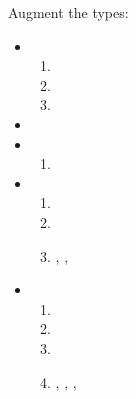 Augment the types:
\begin{itemize}
\item {} 
  \begin{enumerate}
  \item {}
  \item {}
  \item {}
  \end{enumerate}

\item {}
\item {}
  \begin{enumerate}
  \item {}
  \end{enumerate}
\item {}
  \begin{enumerate}
  \item {}
  \item {}
  \item {}, , 
  \end{enumerate}

\item {}
  \begin{enumerate}
  \item {}
  \item {}
  \item {}
  \item {}, , , 
  \end{enumerate} 
\end{itemize}

\iffalse
\begin{lemma}(Balance)\label{lemma:depth}
  \isVal{\texttt{depth}}{\arr{\isOf{s}{\word}}{\zp}{
    \arr{\isOf{d}{\word}}{\zp}{\arr{\tttree{s}{d}}{\constp{2}}{\word}{\zp}}{\zp}}{\zp}}
\end{lemma}

\begin{proof}
  By 3 applications of Lemma~\ref{lemma:abs} and Lemma~\ref{lemma:ret}, 
  it suffices to show that 
  \gammaToComp{\cdot}{\mathsf{to\_nat}\;d}
  {\ttrec{t}{\ret{0}}{\_}{\ret{0}}{dl}{dl+1}{dl}{dl+1}}{\word}{\zp}
  given \isVal{s}{\word}, \isVal{t}{\word}, and \isVal{t}{\tttree{s}{d}}.
  Case on $t$:
  \begin{itemize}
    \item $t = \isOf{\leaf}{\tttree{\mw{0}}{\mw{0}}}$:\\
      Then \evalCost{\ttrec{t}{\ret{0}}{\_}{\ret{0}}{dl}{dl+1}{dl}{dl+1}}{1}{\mw{0}}, 
      and \constp{2} suffices.
    \item 
  \end{itemize}
\end{proof}
\fi

